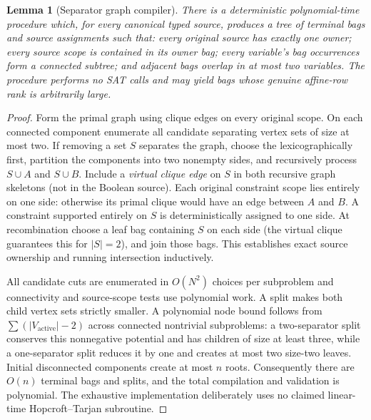 \documentclass[10pt]{article}
\newtheorem{lemma}[theorem]{Lemma}
\begin{document}
\begin{lemma}[Separator graph compiler]\label{lem:split}
There is a deterministic polynomial-time procedure which, for every canonical typed source, produces a tree of terminal bags and source assignments such that: every original source has exactly one owner; every source scope is contained in its owner bag; every variable's bag occurrences form a connected subtree; and adjacent bags overlap in at most two variables. The procedure performs no SAT calls and may yield bags whose genuine affine-row rank is arbitrarily large.
\end{lemma}
\begin{proof}
Form the primal graph using clique edges on every original scope. On each connected component enumerate all candidate separating vertex sets of size at most two. If removing a set $S$ separates the graph, choose the lexicographically first, partition the components into two nonempty sides, and recursively process $S\cup A$ and $S\cup B$. Include a \emph{virtual clique edge} on $S$ in both recursive graph skeletons (not in the Boolean source). Each original constraint scope lies entirely on one side: otherwise its primal clique would have an edge between $A$ and $B$. A constraint supported entirely on $S$ is deterministically assigned to one side. At recombination choose a leaf bag containing $S$ on each side (the virtual clique guarantees this for $|S|=2$), and join those bags. This establishes exact source ownership and running intersection inductively.

All candidate cuts are enumerated in $O(N^2)$ choices per subproblem and connectivity and source-scope tests use polynomial work. A split makes both child vertex sets strictly smaller. A polynomial node bound follows from $\sum(|V_{\text{active}}|-2)$ across connected nontrivial subproblems: a two-separator split conserves this nonnegative potential and has children of size at least three, while a one-separator split reduces it by one and creates at most two size-two leaves. Initial disconnected components create at most $n$ roots. Consequently there are $O(n)$ terminal bags and splits, and the total compilation and validation is polynomial. The exhaustive implementation deliberately uses no claimed linear-time Hopcroft--Tarjan subroutine.
\end{proof}
\end{document}
